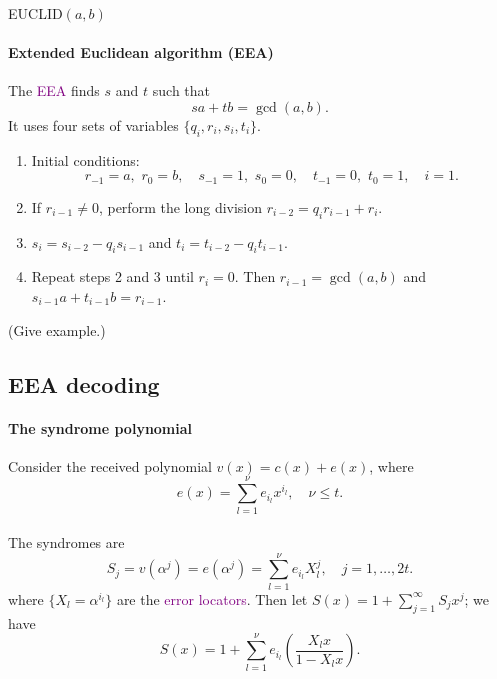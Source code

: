 \documentclass[a4paper, 11pt, openany]{book}
\numberwithin{equation}{section}
\theoremstyle{plain}
\theoremstyle{definition}
\newcommand{\Define}[1]{\textcolor{purple}{#1}}
\begin{document}
\begin{algorithm}[H]
\caption{EUCLID$(a,b)$}
\begin{algorithmic}[1]
		\State{}
	\Else{}
		\State{}
	\EndIf
\end{algorithmic}
\end{algorithm}



\paragraph{Extended Euclidean algorithm (EEA)}
The \Define{EEA} finds $s$ and $t$ such that 
\[
    sa + tb = \gcd(a,b).
\]
It uses four sets of variables $\{q_i, r_i, s_i, t_i\}$.

\begin{enumerate}
	\item Initial conditions: 
	$$
		r_{-1} = a, \,\, r_0 = b, \quad s_{-1} = 1, \,\, s_0 = 0, \quad t_{-1} = 0, \,\, t_0 = 1, \quad i=1.
	$$
	
	\item If $r_{i-1} \ne 0$, perform the long division $r_{i-2} = q_i r_{i-1} + r_i$.
	
	\item $s_i = s_{i-2} - q_i s_{i-1}$ and $t_i = t_{i-2} - q_i t_{i-1}$.
	
	\item Repeat steps 2 and 3 until $r_i = 0$. Then $r_{i-1} = \gcd(a,b)$ and $s_{i-1}a + t_{i-1}b = r_{i-1}$.
\end{enumerate}


(Give example.)









\subsection{EEA decoding}


\paragraph{The syndrome polynomial}
Consider the received polynomial $v(x) = c(x) + e(x)$, where
$$
	e(x) = \sum_{l=1}^\nu e_{i_l} x^{i_l}, \quad \nu \le t.
$$
~\\
The syndromes are
$$
	S_j = v(\alpha^j) = e(\alpha^j) = \sum_{l=1}^\nu e_{i_l} X_l^j, \quad j = 1, \dots, 2t.
$$
where $\{X_l = \alpha^{i_l}\}$ are the \Define{error locators}. Then let $S(x) = 1 + \sum_{j=1}^\infty S_j x^j$; we have
$$
	S(x) = 1 + \sum_{l=1}^\nu e_{i_l} \left( \frac {X_l x} {1 - X_l x} \right).
$$
\end{document}
